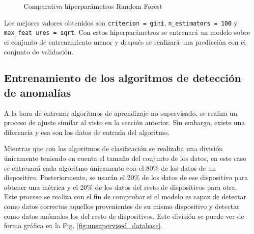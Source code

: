 \begin{figure}[htpb!]
    \centering
    \quad
    \caption{Comparativa hiperparámetros Random Forest}
    \label{fig:comp_hiperparam}
\end{figure}

Los mejores valores obtenidos son \texttt{criterion = gini}, \texttt{n\_estimators = 100} y \texttt{max\_feat ures = sqrt}. Con estos hiperparámetros se entrenará un modelo sobre el conjunto de entrenamiento menor y después se realizará una predicción con el conjunto de validación.


\subsection{Entrenamiento de los algoritmos de detección de anomalías}

A la hora de entrenar algoritmos de aprendizaje no supervisado, se realiza un proceso de ajuste similar al visto en la sección anterior. Sin embargo, existe una diferencia y esa son los datos de entrada del algoritmo.

Mientras que con los algoritmos de clasificación se realizaba una división únicamente teniendo en cuenta el tamaño del conjunto de los datos, en este caso se entrenará cada algoritmo únicamente con el 80\% de los datos de un dispositivo. Posteriormente, se usarán el 20\% de los datos de ese dispositivo para obtener una métrica y el 20\% de los datos del resto de dispositivos para otra. Este proceso se realiza con el fin de comprobar si el modelo es capaz de detectar como datos correctos aquellos provenientes de su mismo dispositivo y detectar como datos anómalos los del resto de dispositivos. Este división se puede ver de forma gráfica en la Fig. \ref{fig:unsupervised_database}.

